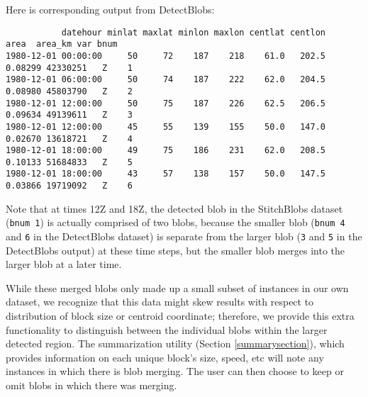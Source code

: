 \documentclass{article}
\begin{document}
Here  is corresponding output from DetectBlobs:

\begin{verbatim}
           datehour minlat maxlat minlon maxlon centlat centlon    area  area_km var bnum
1980-12-01 00:00:00     50     72    187    218    61.0   202.5 0.08299 42330251   Z    1
1980-12-01 06:00:00     50     74    187    222    62.0   204.5 0.08980 45803790   Z    2
1980-12-01 12:00:00     50     75    187    226    62.5   206.5 0.09634 49139611   Z    3
1980-12-01 12:00:00     45     55    139    155    50.0   147.0 0.02670 13618721   Z    4
1980-12-01 18:00:00     49     75    186    231    62.0   208.5 0.10133 51684833   Z    5
1980-12-01 18:00:00     43     57    138    157    50.0   147.5 0.03866 19719092   Z    6
\end{verbatim}

Note that at times 12Z and 18Z, the detected blob in the StitchBlobs dataset (\texttt{bnum 1}) is actually comprised of two  blobs, because the smaller blob (\texttt{bnum 4} and \texttt{6} in the DetectBlobs dataset) is separate from the larger blob (\texttt{3} and \texttt{5} in the DetectBlobs output) at these time steps, but the smaller blob merges into the larger blob at a later time.


While these merged blobs only made up a small subset of instances in our own dataset, we recognize that this data might skew results with respect to distribution of block size or centroid coordinate; therefore, we provide this extra functionality to distinguish between the individual blobs within the larger detected region. The summarization utility (Section \ref{summarysection}), which provides information on each unique block's size, speed, etc will note any instances in which there is blob merging. The user can then choose to keep or omit blobs in which there was merging.
\end{document}
